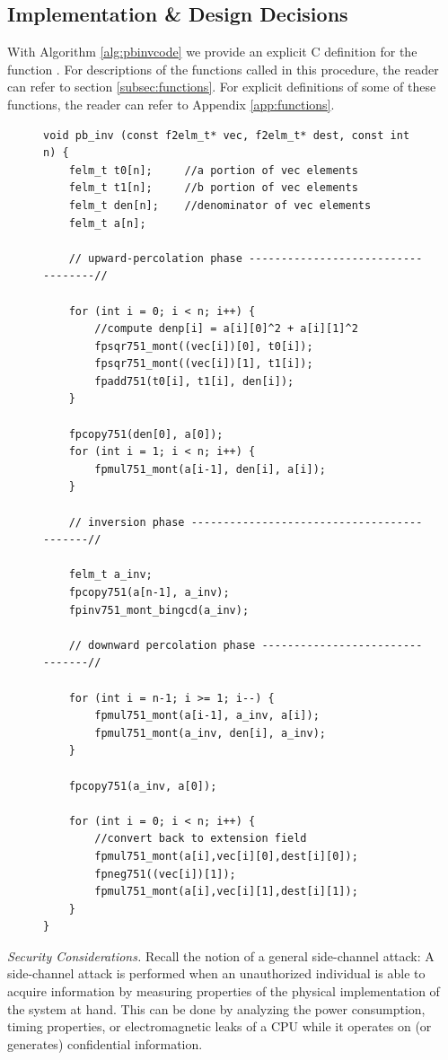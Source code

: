 \subsection{Implementation \& Design Decisions}

With Algorithm \ref{alg:pbinvcode} we provide an explicit C definition for the function . For descriptions of the functions called in this procedure, the reader can refer to section \ref{subsec:functions}. For explicit definitions of some of these functions, the reader can refer to Appendix \ref{app:functions}.

\begin{figure}
\begin{lstlisting}
void pb_inv (const f2elm_t* vec, f2elm_t* dest, const int n) {
	felm_t t0[n];     //a portion of vec elements
	felm_t t1[n];     //b portion of vec elements
	felm_t den[n];    //denominator of vec elements
	felm_t a[n];

	// upward-percolation phase -----------------------------------//

	for (int i = 0; i < n; i++) {
		//compute denp[i] = a[i][0]^2 + a[i][1]^2
		fpsqr751_mont((vec[i])[0], t0[i]);
		fpsqr751_mont((vec[i])[1], t1[i]);
		fpadd751(t0[i], t1[i], den[i]);
	}	

	fpcopy751(den[0], a[0]);
	for (int i = 1; i < n; i++) {
		fpmul751_mont(a[i-1], den[i], a[i]);
	}

	// inversion phase -------------------------------------------//
	
	felm_t a_inv;
	fpcopy751(a[n-1], a_inv);
	fpinv751_mont_bingcd(a_inv);
    
	// downward percolation phase --------------------------------//

	for (int i = n-1; i >= 1; i--) {
		fpmul751_mont(a[i-1], a_inv, a[i]);
		fpmul751_mont(a_inv, den[i], a_inv);
	}

	fpcopy751(a_inv, a[0]);

	for (int i = 0; i < n; i++) {
		//convert back to extension field
		fpmul751_mont(a[i],vec[i][0],dest[i][0]);
		fpneg751((vec[i])[1]);
		fpmul751_mont(a[i],vec[i][1],dest[i][1]);
	}
}
\end{lstlisting}
\caption{}
\label{code:pbinv}
\end{figure}

\emph{Security Considerations.} Recall the notion of a general side-channel attack: A side-channel attack is performed when an unauthorized individual is able to acquire information by measuring properties of the physical implementation of the system at hand. This can be done by analyzing the power consumption, timing properties, or electromagnetic leaks of a CPU while it operates on (or generates) confidential information.

